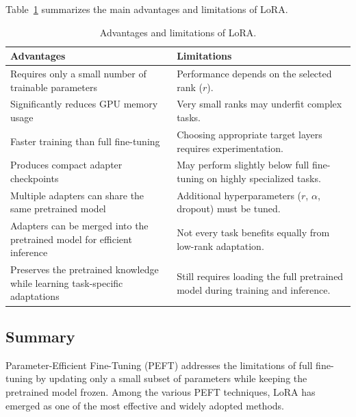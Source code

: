 Table~\ref{tab:lora_advantages_limitations} summarizes the main advantages and limitations of LoRA.
\begin{table}[H]
\centering
\caption{Advantages and limitations of LoRA.}
\label{tab:lora_advantages_limitations}

\renewcommand{\arraystretch}{1.35}

\begin{tabular}{p{7cm}p{7cm}}
\toprule
\textbf{Advantages} & \textbf{Limitations} \\
\midrule

Requires only a small number of trainable parameters &
Performance depends on the selected rank ($r$). \\

Significantly reduces GPU memory usage &
Very small ranks may underfit complex tasks. \\

Faster training than full fine-tuning &
Choosing appropriate target layers requires experimentation. \\

Produces compact adapter checkpoints &
May perform slightly below full fine-tuning on highly specialized tasks. \\

Multiple adapters can share the same pretrained model &
Additional hyperparameters ($r$, $\alpha$, dropout) must be tuned. \\

Adapters can be merged into the pretrained model for efficient inference &
Not every task benefits equally from low-rank adaptation. \\

Preserves the pretrained knowledge while learning task-specific adaptations &
Still requires loading the full pretrained model during training and inference. \\

\bottomrule
\end{tabular}

\end{table}
\subsection*{Summary}

Parameter-Efficient Fine-Tuning (PEFT) addresses the limitations of full fine-tuning by updating only a small subset of parameters while keeping the pretrained model frozen. Among the various PEFT techniques, LoRA has emerged as one of the most effective and widely adopted methods.

